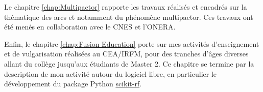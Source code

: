 Le chapitre \ref{chap:Multipactor} rapporte les travaux réalisés et encadrés sur la thématique des arcs et notamment du phénomène multipactor. Ces travaux ont été menés en collaboration avec le CNES et l'ONERA.

Enfin, le chapitre \ref{chap:Fusion Education} porte sur mes activités d'enseignement et de vulgarisation réalisées au CEA/IRFM, pour des tranches d'âges diverses allant du collège jusqu'aux étudiants de Master 2. Ce chapitre se termine par la description de mon activité autour du logiciel libre, en particulier le développement du package Python \href{http://scikit-rf.org/}{scikit-rf}.




